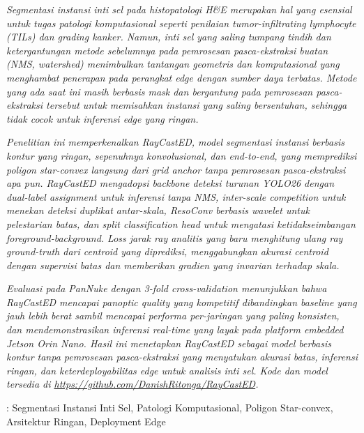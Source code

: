 \textit{Segmentasi instansi inti sel pada histopatologi H\&E merupakan hal yang esensial untuk tugas patologi komputasional seperti penilaian tumor-infiltrating lymphocyte (TILs) dan grading kanker. Namun, inti sel yang saling tumpang tindih dan ketergantungan metode sebelumnya pada pemrosesan pasca-ekstraksi buatan (NMS, watershed) menimbulkan tantangan geometris dan komputasional yang menghambat penerapan pada perangkat edge dengan sumber daya terbatas. Metode yang ada saat ini masih berbasis mask dan bergantung pada pemrosesan pasca-ekstraksi tersebut untuk memisahkan instansi yang saling bersentuhan, sehingga tidak cocok untuk inferensi edge yang ringan.}

\textit{Penelitian ini memperkenalkan RayCastED, model segmentasi instansi berbasis kontur yang ringan, sepenuhnya konvolusional, dan end-to-end, yang memprediksi poligon star-convex langsung dari grid anchor tanpa pemrosesan pasca-ekstraksi apa pun. RayCastED mengadopsi backbone deteksi turunan YOLO26 dengan dual-label assignment untuk inferensi tanpa NMS, inter-scale competition untuk menekan deteksi duplikat antar-skala, ResoConv berbasis wavelet untuk pelestarian batas, dan split classification head untuk mengatasi ketidakseimbangan foreground-background. Loss jarak ray analitis yang baru menghitung ulang ray ground-truth dari centroid yang diprediksi, menggabungkan akurasi centroid dengan supervisi batas dan memberikan gradien yang invarian terhadap skala.}

\textit{Evaluasi pada PanNuke dengan 3-fold cross-validation menunjukkan bahwa RayCastED mencapai panoptic quality yang kompetitif dibandingkan baseline yang jauh lebih berat sambil mencapai performa per-jaringan yang paling konsisten, dan mendemonstrasikan inferensi real-time yang layak pada platform embedded Jetson Orin Nano. Hasil ini menetapkan RayCastED sebagai model berbasis kontur tanpa pemrosesan pasca-ekstraksi yang menyatukan akurasi batas, inferensi ringan, dan keterdeployabilitas edge untuk analisis inti sel. Kode dan model tersedia di \url{https://github.com/DanishRitonga/RayCastED}.}

 : Segmentasi Instansi Inti Sel, Patologi Komputasional, Poligon Star-convex, Arsitektur Ringan, Deployment Edge
